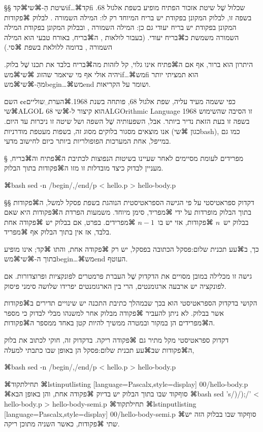 §§ שיטת הַ-⌘שי{⌘קד{if}…⌘קד{fi}}
שכלול שֶׁל שיטת אזכור הפתיח מופיע בשפת אלגול 68. בשפה זו, לבלוק המקונן בפקודת
 יש בריח המיוחד רק לו: המילה השמורה . לבלוק ⌘פקודות המקונן בפקודת
 יש בריח יעודי גם כן: המילה השמורה , ובבלוק המקונן בפקודת
 המילה השמורה  משמשת כ⌘בריח יעודי. (בעבור לולאות
, ה⌘בריח, באורח טבעי הוא המילה השמורה
, בדומה ללולאת  בשפת ⌘סי.)

היתרון הוא ברור, אף אם ה⌘פתיח אינו גלוי, קל לזהות מה⌘בריח בלבד
את תכנו שֶׁל בלוק. יהיה אולי אף מי שיאמר שהזוג ⌘שי{⌘מש{if}…⌘מש{fi}} הוא תמציתי יותר
מהַ-⌘שי{⌘מש{begin}…⌘מש{end}} ושומר על הקריאות.

כפי ששמה מעיד עליה, שפת אלגול 68, פותחה בשנת 1968.⌘הערת␣שוליים{¢¢
  השם ⌘שי{ALGOL 68} הוא קיצור ל-⌘שי{ALGOrithmic Language 1968}}
זו הסיבה שהשימוש בשפה זו בעת הזאת נדיר ביותר. אבל, השפעותיה שֶׁל השפה ושל שיטה
זו ניכרות עד היום. אנו מוצאים מסגור בלוקים מסוג זה, בשפות מעטפת מודרניות (כגון
⌘שי{bash}), כמו גם במייפל, אחת המערכות הפופולריות ביותר כיום לחישוב מדעי.

§ מפרידים לעומת מסיימים
לאחר שעיינו בשיטות הנפוצות לכתיבת ה⌘פתיח וה⌘בריח, מעניין לבדוק כיצד מובדלות
זו מזו ה⌘פקודות בתוך הבלוק.

⌘bash
sed -n /begin/,/end/p < hello.p > hello-body.p
\END

§§ דקדוק ספראטיסטי
על פי הגישה הספראטיסטית הנוהגת בשפת פסקל למשל, ה⌘פקודות בתוך הבלוק מופרדות על
ידי ⌘מפריד, סימן מיוחד. משמעות הפרדת ה⌘פקודות היא שאם בבלוק יש~\(n\) ⌘פקודות, אזי
יש בו~\(n-1\) ⌘מפרידים. בפרט, אם בבלוק יש ⌘פקודה אחת בלבד,
אז אין בתוך הבלוק אף ⌘מפריד.

כך, ב⌘עע תכנית שלום:פסקל הכתובה בפסקל, יש רק ⌘פקודה אחת, והתו ⌘קד{;} אינו
מופיע בתוך ה-⌘שי{⌘מש{begin}…⌘מש{end}} העוטף.

גישה זו מכלילה במובן מסויים את הדקדוק שֶׁל העברת פרמטרים לפונקציות ופרוצדורות. אם
לפונקציה יש ארבעה ארגומנטים, הרי בין הארגומנטים יפרידו שלושה סימני פיסוק.

הקושי בדקדוק הספראטיסטי הוא בכך שבמהלך כתיבת התכנה יש שינויים תדירים ב⌘פקודות
אשר בבלוק. לא ניתן להעביר ⌘פקודה מבלוק אחר למשנהו מבלי לבדוק כי מספר ה⌘מפרידים
הן במקור ובמטרה ממשיך להיות קטן באחד ממספר ה⌘פקודות.

דקדוק ספראטיסטי מקל מתיר גם ⌘פקודה ריקה. בדקדוק זה,
חוקי לכתוב את בלוק ה⌘פקודות שב⌘עע תכנית שלום:פסקל הן באופן שבו כתבתי למעלה,

⌘bash
sed -n /begin/,/end/p < hello.p > hello-body.p
\END


⌘תחילת{קוד}
⌘lstinputlisting
[language=Pascalx,style=display]
{00/hello-body.p}
⌘סוף{קוד}
שבו בתוך הבלוק יש בדיוק ⌘פקודה אחת, והן באופן הבא
⌘bash
sed 's/)/);/' < hello-body.p > hello-body-semi.p
\END
⌘תחילת{קוד}
⌘lstinputlisting
[language=Pascalx,style=display]
{00/hello-body-semi.p}
⌘סוף{קוד}
שבו בבלוק הזה יש שתי ⌘פקודות, כאשר השניה מתוכן ריקה.

